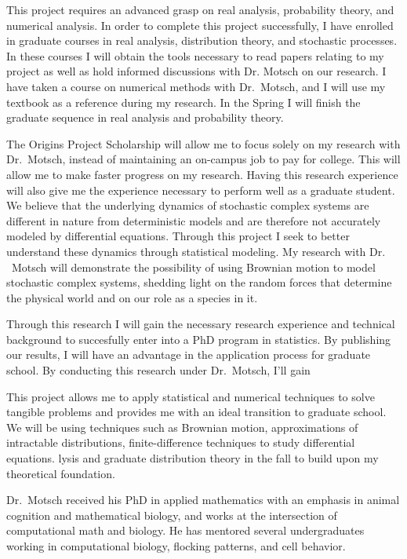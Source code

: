 \documentclass[8 pt, leqno]{article}
\begin{document}
This project requires an advanced grasp on real analysis, probability theory, and numerical analysis. In order to complete this project successfully, I have enrolled in graduate courses in real analysis,  distribution theory, and stochastic processes. In these courses I will obtain the tools necessary to read papers relating to my project as well as hold informed discussions with Dr. Motsch on our research. I have taken a course on numerical methods with Dr.\ Motsch, and I will use my textbook as a reference during my research. In the Spring I will finish the graduate sequence in real analysis and probability theory.




The Origins Project Scholarship will allow me to focus solely on my research with Dr.\ Motsch, instead of maintaining an on-campus job to pay for college. This will allow me to make faster progress on my research. Having this research experience will also give me the experience necessary to perform well as a graduate student. We believe that the underlying dynamics of stochastic complex systems are different in nature from deterministic models and are therefore not accurately modeled by differential equations. Through this project I seek to better understand these dynamics through statistical modeling. My research with Dr. \ Motsch will demonstrate the possibility of using Brownian motion to model stochastic complex systems, shedding light on the random forces that determine the physical world and on our role as a species in it.


 \newpage


Through this research I will gain the necessary research experience and technical background to succesfully enter into a PhD program in statistics. By publishing our results, I will have an advantage in the application process for graduate school. By conducting this research under Dr.\ Motsch, I'll gain 

This project allows me to apply statistical and numerical techniques to solve tangible problems and provides me with an ideal transition to graduate school. We will be using techniques such as Brownian motion,  approximations of intractable distributions, finite-difference techniques to study differential equations. lysis and graduate distribution theory in the fall to build upon my theoretical foundation.

 Dr.\ Motsch received his PhD in applied mathematics with an emphasis in animal cognition and mathematical biology, and works at the intersection of computational math and biology. He has mentored several undergraduates working in computational biology, flocking patterns, and cell behavior.
\end{document}
